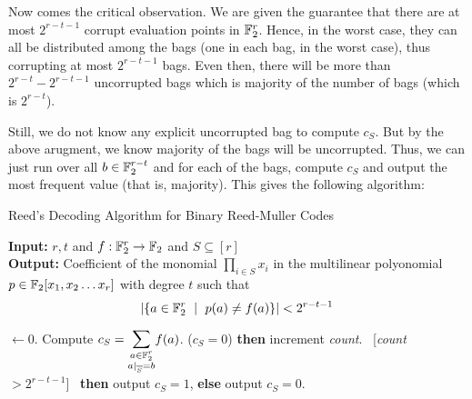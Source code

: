 Now comes the critical observation. We are given the guarantee that there are at most $2^{r-t-1}$ corrupt evaluation points in ${\mathbb{F}}_2^r$. Hence, in the worst case, they can all be distributed among the bags (one in each bag, in the worst case), thus corrupting at most $2^{r-t-1}$ bags. Even then, there will be more than $2^{r-t} - 2^{r-t-1}$ uncorrupted bags which is majority of the number of bags (which is $2^{r-t}$).

Still, we do not know any explicit uncorrupted bag to compute $c_S$. But by the above arugment, we know majority of the bags will be uncorrupted. Thus, we can just run over all $b \in {\mathbb{F}}_2^{r-t}$ and for each of the bags, compute $c_S$ and output the most frequent value (that is, majority). This gives the following algorithm:

\begin{algorithm}
\label{alg:Berlekamp-Welch}
\caption{Reed's Decoding Algorithm for Binary Reed-Muller Codes}
{\bf Input:} $r,t$ and $f : {\mathbb{F}}_2^r \to {\mathbb{F}}_2$ and $S \subseteq [r]$\\
{\bf Output: } Coefficient of the monomial $\prod_{i \in S} x_i$ in the multilinear polyonomial $p \in {\mathbb{F}}_2[x_1, x_2 \ldots x_r]$ with degree $t$ such that 
$$|\{a \in {\mathbb{F}}_2^r~\mid~p(a) \neq f(a) \}| < 2^{r-t-1}$$
\begin{algorithmic}[1]
 $\gets 0$.
	\State Compute $c_S = \bigsum_{\substack{a \in \F_2^r \\ a|_{\overline{S}} = b}} f(a)$.
	 ($c_S = 0$) \textbf{then} increment {\em count}.
\EndFor
{} ~[{\em count} $> 2^{r-t-1}$]~ \textbf{then} output {\sf $c_S = 1$}, \textbf{else} output {\sf $c_S = 0$}.
\end{algorithmic}
\end{algorithm}

